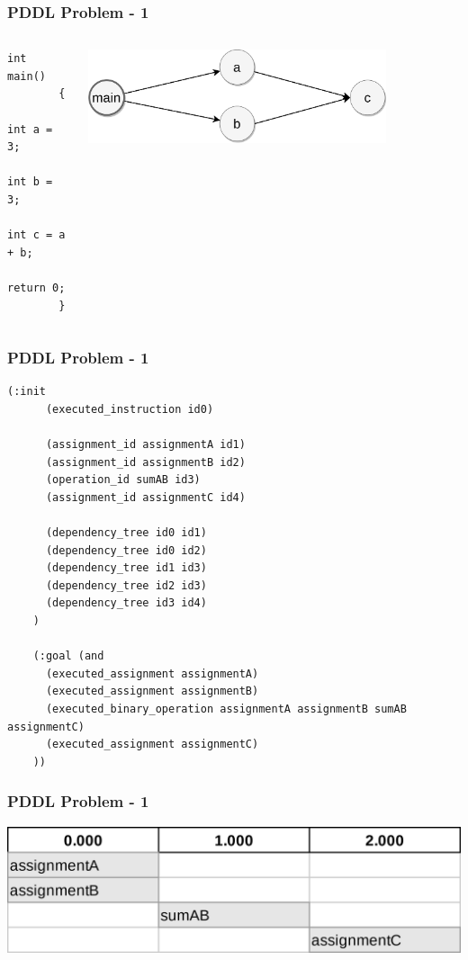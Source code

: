 \documentclass{beamer}
\begin{document}
\begin{frame}[fragile]
  \frametitle{PDDL Problem - 1}

  \begin{columns}
    \begin{column}{0.35\textwidth}
      \begin{lstlisting}[style=cppStyle]
        int main()
        {
          int a = 3;
          int b = 3;
          int c = a + b;
          return 0;
        }
      \end{lstlisting}
    \end{column}
    \begin{column}{0.65\textwidth}
      \begin{center}
        \includegraphics[width=0.8\textwidth]{../images/dependency-tree-Parallel.png}
      \end{center}
    \end{column}
  \end{columns}
\end{frame}

\begin{frame}[fragile]
  \frametitle{PDDL Problem - 1}

  \begin{lstlisting}[style=pddlStyle,basicstyle=\ttfamily\fontsize{10pt}{10pt}\selectfont]
    (:init
      (executed_instruction id0)

      (assignment_id assignmentA id1)
      (assignment_id assignmentB id2)
      (operation_id sumAB id3)
      (assignment_id assignmentC id4)
      
      (dependency_tree id0 id1)
      (dependency_tree id0 id2)
      (dependency_tree id1 id3)
      (dependency_tree id2 id3)
      (dependency_tree id3 id4)
    )

    (:goal (and
      (executed_assignment assignmentA)
      (executed_assignment assignmentB)
      (executed_binary_operation assignmentA assignmentB sumAB assignmentC)
      (executed_assignment assignmentC)
    ))
  \end{lstlisting}
\end{frame}

\begin{frame}[fragile]
  \frametitle{PDDL Problem - 1}

  \includegraphics[width=1\textwidth]{../images/parallel-tasks-Parallel.png}
\end{frame}
\end{document}
